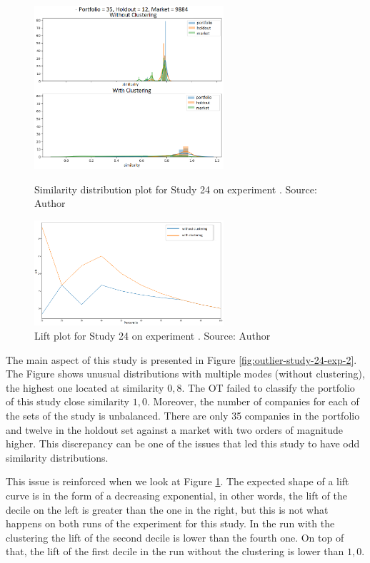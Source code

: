 \begin{figure}[h]
   \centering
   \includegraphics[width=7cm]{fig/ch4-outlier-study-24-exp-2.png}
   \caption{Similarity distribution plot for Study 24 on experiment \nameExperimentII{}. Source: Author}
   \label{fig:outlier-study-24-exp-2}

   \includegraphics[width=7cm]{fig/ch4-outlier-study-24-lift-exp-2.png}
   \caption{Lift plot for Study 24 on experiment \nameExperimentII{}. Source: Author}
   \label{fig:outlier-study-24-lift-exp-2}
\end{figure}

The main aspect of this study is presented in Figure \ref{fig:outlier-study-24-exp-2}. The Figure shows unusual distributions with multiple modes (without clustering), the highest one located at similarity $0,8$. The OT failed to classify the portfolio of this study close similarity $1,0$. Moreover, the number of companies for each of the sets of the study is unbalanced. There are only 35 companies in the portfolio and twelve in the holdout set against a market with two orders of magnitude higher. This discrepancy can be one of the issues that led this study to have odd similarity distributions.

This issue is reinforced when we look at Figure \ref{fig:outlier-study-24-lift-exp-2}. The expected shape of a lift curve is in the form of a decreasing exponential, in other words, the lift of the decile on the left is greater than the one in the right, but this is not what happens on both runs of the experiment for this study. In the run with the clustering the lift of the second decile is lower than the fourth one. On top of that, the lift of the first decile in the run without the clustering is lower than $1,0$. 

